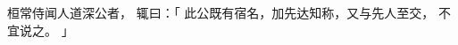 
\switchcolumn*[\section{}]

桓常侍闻人道深公者，
辄曰：「
    此公既有宿名，加先达知称，又与先人至交，
    不宜说之。
」

\switchcolumn



